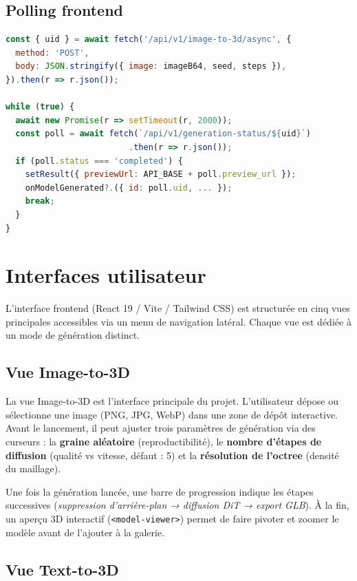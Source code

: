 \documentclass[12pt,a4paper,oneside]{report}
\begin{document}
\subsection{Polling frontend}
\begin{lstlisting}[language=JavaScript,
  caption={Génération asynchrone --- ImageTo3D.tsx}]
const { uid } = await fetch('/api/v1/image-to-3d/async', {
  method: 'POST',
  body: JSON.stringify({ image: imageB64, seed, steps }),
}).then(r => r.json());

while (true) {
  await new Promise(r => setTimeout(r, 2000));
  const poll = await fetch(`/api/v1/generation-status/${uid}`)
                         .then(r => r.json());
  if (poll.status === 'completed') {
    setResult({ previewUrl: API_BASE + poll.preview_url });
    onModelGenerated?.({ id: poll.uid, ... });
    break;
  }
}
\end{lstlisting}

\section{Interfaces utilisateur}
\label{sec:ui}

L'interface frontend (React 19 / Vite / Tailwind CSS) est structurée
en cinq vues principales accessibles via un menu de navigation latéral.
Chaque vue est dédiée à un mode de génération distinct.

\subsection{Vue Image-to-3D}

La vue Image-to-3D est l'interface principale du projet. L'utilisateur
dépose ou sélectionne une image (PNG, JPG, WebP) dans une zone de dépôt
interactive. Avant le lancement, il peut ajuster trois paramètres de
génération via des curseurs : la \textbf{graine aléatoire} (reproductibilité),
le \textbf{nombre d'étapes de diffusion} (qualité vs vitesse, défaut : 5)
et la \textbf{résolution de l'octree} (densité du maillage).

Une fois la génération lancée, une barre de progression indique les
étapes successives (\textit{suppression d'arrière-plan → diffusion DiT →
export GLB}). À la fin, un aperçu 3D interactif (\texttt{<model-viewer>})
permet de faire pivoter et zoomer le modèle avant de l'ajouter à la
galerie.

\subsection{Vue Text-to-3D}
\end{document}
